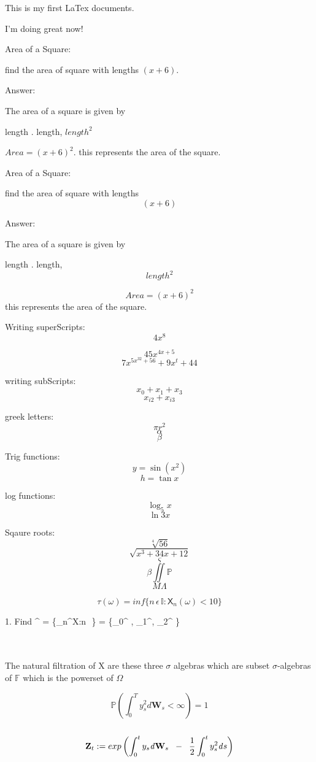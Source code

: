 \documentclass[11pt]{article}
\begin{document}
This is my first LaTex documents.

I'm doing great now!

Area of a Square:

find the area of square with lengths $(x+6)$.

Answer:

The area of a square is given by


length $.$ length, $length^2$

$Area = (x+6)^2$. this represents the area of the square.


Area of a Square:

find the area of square with lengths $$(x+6)$$

Answer:

The area of a square is given by


length $.$ length, $$length^2$$

$$Area = (x+6)^2$$this represents the area of the square.


Writing superScripts: $$4x^8$$

$$45x^{4x+5}$$
$$7x^{5x^{32}+56} + 9x^t + 44$$



writing subScripts: $$x_0 + x_1 + x_3$$
$$x_{i2}+x_{i3}$$


greek letters:
$$\pi r^2$$
$$\alpha$$
$$\beta$$


Trig functions:
$$y=\sin(x^2)$$
$$h=\tan{x}$$


log functions:$$\log_5{x}$$
$$\ln{3x}$$


Sqaure roots:
$$\sqrt[4]{56}$$
$$\sqrt{x^3+34x+12}$$
$$\varsigma$$
$$\beta \iint \mathbb{P}$$
$$M \varLambda $$

$$\tau (\omega) = inf\{n\,\epsilon \,\mathbb{I} :\mathsf{X}_n(\omega)< 10\} $$

1. Find ^  = \{_n^X:n\,\epsilon \, \}  = \{_0^ , _1^,  _2^  \}


%
%
\\
\\
The natural filtration of X are these three $\sigma$ algebras which are subset $\sigma$-algebras of $\mathbb{F}$ which is the powerset of $\Omega$

$$\mathbb{P}\left(\int^T_0 y^2_s\mathit{d}\mathbf{W}_s < \infty\right) = 1$$\\
$$\mathbf{Z}_t := exp\left(\int_0^t y_s\mathit{d}\mathbf{W}_s \hspace{2mm}-\hspace{2mm}\frac{1}{2}\int_0^t y_s^2\mathit{d}s\right)$$\\
\end{document}
